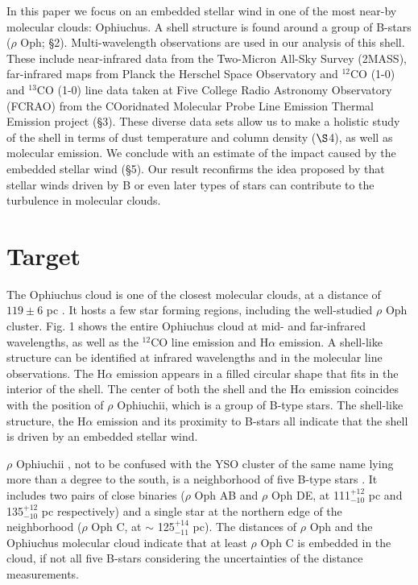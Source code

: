 \documentclass[11pt,a4paper]{emulateapj}
\begin{document}
In this paper we focus on an embedded stellar wind in one of the most near-by molecular clouds: Ophiuchus. A shell structure is found around a group of B-stars ($\rho$ Oph; \S2). Multi-wavelength observations are used in our analysis of this shell. These include near-infrared data from the Two-Micron All-Sky Survey (2MASS), far-infrared maps from Planck the Herschel Space Observatory and $^{12}$CO (1-0) and $^{13}$CO (1-0) line data taken at Five College Radio Astronomy Observatory (FCRAO) from the COoridnated Molecular Probe Line Emission Thermal Emission \citep[COMPLETE;]{Ridge_2006} project (\S3). These diverse data sets allow us to make a holistic study of the shell in terms of dust temperature and column density ($\S$4), as well as molecular emission. We conclude with an estimate of the impact caused by the embedded stellar wind (\S5). Our result reconfirms the idea proposed by \citet{Arce_2011} that stellar winds driven by B or even later types of stars can contribute to the turbulence in molecular clouds.

\section{Target}
The Ophiuchus cloud is one of the closest molecular clouds, at a distance of $119 \pm 6$ pc \citep{Lombardi_2008}. It hosts a few star forming regions, including the well-studied $\rho$ Oph cluster. Fig. 1 shows the entire Ophiuchus cloud at mid- and far-infrared wavelengths, as well as the $^{12}$CO line emission and H$\alpha$ emission. A shell-like structure can be identified at infrared wavelengths and in the molecular line observations. The H$\alpha$ emission appears in a filled circular shape that fits in the interior of the shell. The center of both the shell and the H$\alpha$ emission coincides with the position of $\rho$ Ophiuchii, which is a group of B-type stars. The shell-like structure, the H$\alpha$ emission and its proximity to B-stars all indicate that the shell is driven by an embedded stellar wind. 

$\rho$ Ophiuchii \citep[16h 25m 35.12s, -23d 26m 49.82s, J2000,]{van_Leeuwen_2007}, not to be confused with the YSO cluster of the same name lying more than a degree to the south, is a neighborhood of five B-type stars \citep{Cordiner_2013}. It includes two pairs of close binaries ($\rho$ Oph AB and $\rho$ Oph DE, at 111$^{+12}_{-10}$ pc and 135$^{+12}_{-10}$ pc respectively) and a single star at the northern edge of the neighborhood ($\rho$ Oph C, at $\sim$ 125$^{+14}_{-11}$ pc). The distances of $\rho$ Oph and the Ophiuchus molecular cloud indicate that at least $\rho$ Oph C is embedded in the cloud, if not all five B-stars considering the uncertainties of the distance measurements.
\end{document}
